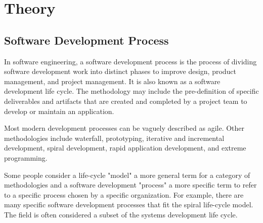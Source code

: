 \documentclass[12pt,a4paper,titlepage]{article}
\begin{document}
\section{Theory}

\subsection{Software Development Process}
In software engineering, a software development process is the process of dividing software development work into distinct phases to improve design, product management, and project management. It is also known as a software development life cycle. The methodology may include the pre-definition of specific deliverables and artifacts that are created and completed by a project team to develop or maintain an application.\par
Most modern development processes can be vaguely described as agile. Other methodologies include waterfall, prototyping, iterative and incremental development, spiral development, rapid application development, and extreme programming.\par
Some people consider a life-cycle "model" a more general term for a category of methodologies and a software development "process" a more specific term to refer to a specific process chosen by a specific organization. For example, there are many specific software development processes that fit the spiral life-cycle model. The field is often considered a subset of the systems development life cycle.\par
\clearpage
\end{document}
